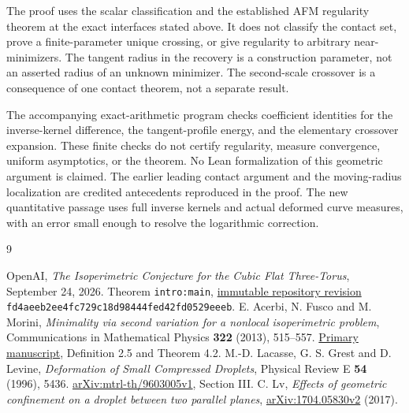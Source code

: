 \documentclass[11pt]{article}
\theoremstyle{remark}\newtheorem{remark}[theorem]{Remark}
\numberwithin{equation}{section}
\begin{document}
The proof uses the scalar classification and the established AFM
regularity theorem at the exact interfaces stated above. It does not
classify the contact set, prove a finite-parameter unique crossing, or
give regularity to arbitrary near-minimizers. The tangent radius in the
recovery is a construction parameter, not an asserted radius of an
unknown minimizer. The second-scale crossover is a consequence of one
contact theorem, not a separate result.

The accompanying exact-arithmetic program checks coefficient identities
for the inverse-kernel difference, the tangent-profile energy, and the
elementary crossover expansion. These finite checks do not certify
regularity, measure convergence, uniform asymptotics, or the theorem.
No Lean formalization of this geometric argument is claimed. The earlier
leading contact argument and the moving-radius localization are credited
antecedents reproduced in the proof. The new quantitative passage uses
full inverse kernels and actual deformed curve measures, with an error
small enough to resolve the logarithmic correction.

\begin{thebibliography}{9}
\raggedright
{} OpenAI, \emph{The Isoperimetric Conjecture for the Cubic
Flat Three-Torus}, September 24, 2026. Theorem \texttt{intro:main},
\href{https://github.com/openai/math/tree/fd4aeeb2ee4fc729c18d98444fed42fd0529eeeb}{immutable repository revision}
\texttt{fd4aeeb2ee4fc729c18d98444fed42fd0529eeeb}.
 E. Acerbi, N. Fusco and M. Morini,
\emph{Minimality via second variation for a nonlocal isoperimetric problem},
Communications in Mathematical Physics \textbf{322} (2013), 515--557.
\href{https://cvgmt.sns.it/media/doc/paper/540/Acerbi-Fusco-Morini.FINAL.pdf}{Primary manuscript},
Definition 2.5 and Theorem 4.2.
 M.-D. Lacasse, G. S. Grest and D. Levine,
\emph{Deformation of Small Compressed Droplets}, Physical Review E
\textbf{54} (1996), 5436.
\href{https://arxiv.org/abs/mtrl-th/9603005v1}{arXiv:mtrl-th/9603005v1}, Section III.
 C. Lv, \emph{Effects of geometric confinement on a droplet
between two parallel planes},
\href{https://arxiv.org/abs/1704.05830v2}{arXiv:1704.05830v2} (2017).
\end{thebibliography}
\end{document}
